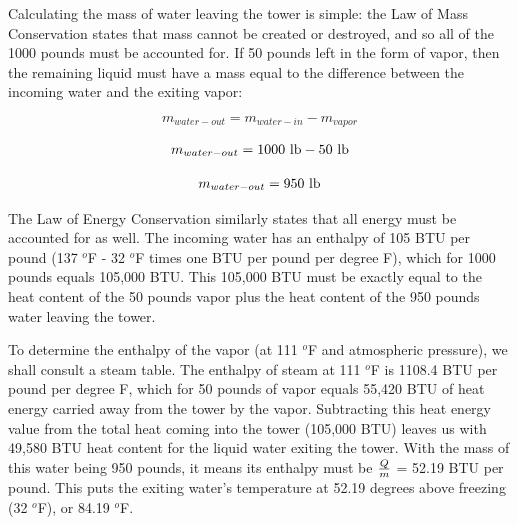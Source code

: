 
Calculating the mass of water leaving the tower is simple: the Law of Mass Conservation states that mass cannot be created or destroyed, and so all of the 1000 pounds must be accounted for.  If 50 pounds left in the form of vapor, then the remaining liquid must have a mass equal to the difference between the incoming water and the exiting vapor:

$$m_{water-out} = m_{water-in} - m_{vapor}$$

$$m_{water-out} = 1000 \hbox{ lb} - 50 \hbox{ lb}$$

$$m_{water-out} = 950 \hbox{ lb}$$

\vskip 10pt

The Law of Energy Conservation similarly states that all energy must be accounted for as well.  The incoming water has an enthalpy of 105 BTU per pound (137 $^{o}$F - 32 $^{o}$F times one BTU per pound per degree F), which for 1000 pounds equals 105,000 BTU.  This 105,000 BTU must be exactly equal to the heat content of the 50 pounds vapor plus the heat content of the 950 pounds water leaving the tower.

\vskip 10pt

To determine the enthalpy of the vapor (at 111 $^{o}$F and atmospheric pressure), we shall consult a steam table.  The enthalpy of steam at 111 $^{o}$F is 1108.4 BTU per pound per degree F, which for 50 pounds of vapor equals 55,420 BTU of heat energy carried away from the tower by the vapor.  Subtracting this heat energy value from the total heat coming into the tower (105,000 BTU) leaves us with 49,580 BTU heat content for the liquid water exiting the tower.  With the mass of this water being 950 pounds, it means its enthalpy must be $Q \over m$ = 52.19 BTU per pound.  This puts the exiting water's temperature at 52.19 degrees above freezing (32 $^{o}$F), or 84.19 $^{o}$F.











